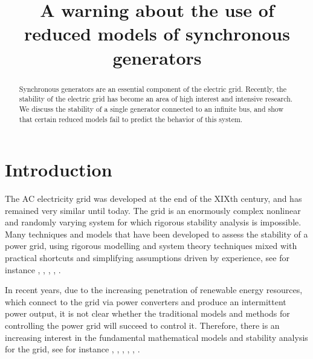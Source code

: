 \documentclass[conference]{IEEEtran}
\begin{document}
\title{A warning about the use of reduced models of synchronous 
       generators }
\author{  \and 
    }

\maketitle

\begin{abstract}
Synchronous generators are an essential component of the electric
grid. Recently, the stability of the electric grid has become an area
of high interest and intensive research. We discuss the stability of a
single generator connected to an infinite bus, and show that certain
reduced models fail to predict the behavior of this system.
\end{abstract}

\section{Introduction}

The AC electricity grid was developed at the end of the XIXth century,
and has remained very similar until today. The grid is an enormously
complex nonlinear and randomly varying system for which rigorous
stability analysis is impossible. Many techniques and models that have
been developed to assess the stability of a power grid, using rigorous
modelling and system theory techniques mixed with practical shortcuts
and simplifying assumptions driven by experience, see for instance
\cite{Kundur}, \cite{GrSt2014}, \cite{SauerPai1998}, \cite{GOBS:03},
\cite{DoBull:12}.

In recent years, due to the increasing penetration of renewable energy
resources, which connect to the grid via power converters and produce
an intermittent power output, it is not clear whether the traditional
models and methods for controlling the power grid will succeed to
control it. Therefore, there is an increasing interest in the
fundamental mathematical models and stability analysis for the grid,
see for instance \cite{DoBull:12}, \cite{PoDoBu:13}, \cite{CaTa:14},
\cite{NaWe:14}, \cite{NaWe:15}, \cite{DePersiSchaft:16}.
\end{document}
